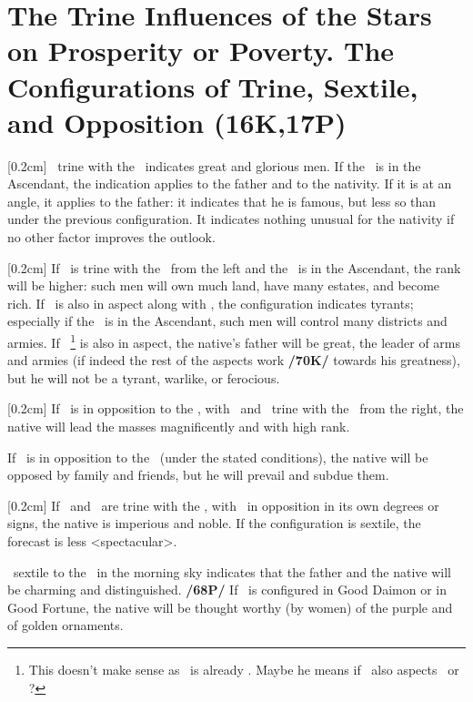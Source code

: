 \section{The Trine Influences of the Stars on Prosperity or Poverty. The Configurations of Trine, Sextile, and Opposition (16K,17P)}
\marginnote{\Jupiter \Trine \Sun}[0.2cm]
\Jupiter\, trine with the \Sun\, indicates great and glorious men. If the \Sun\, is in the Ascendant, the indication applies to the father and to the nativity. If it is at an angle, it applies to the father: it indicates that he is famous, but less so than under the previous configuration. It indicates nothing unusual for the nativity if no other factor improves the outlook. 

\marginnote{\Saturn \Trine \Sun}[0.2cm]
If \Saturn\, is trine with the \Sun\, from the left and the \Sun\, is in the Ascendant, the rank will be higher: such men will own much land, have many estates, and become rich. If \Mars\, is also in aspect along with \Jupiter, the configuration indicates tyrants; especially if the \Sun\, is in the Ascendant, such men will control many districts and armies. If \Saturn\, \footnote{This doesn't make sense as \Saturn\, is already \Trine\Sun. Maybe he means if \Saturn\, also aspects \Mars\, or \Jupiter?} is also in aspect, the native’s father will be great, the leader of arms and armies (if indeed the rest of the aspects work \textbf{/70K/} towards his greatness), but he will not be a tyrant, warlike, or ferocious. 

\marginnote{\Mars \Opposition \Sun}[0.2cm]
If \Mars\, is in opposition to the \Sun, with \Jupiter\, and \Saturn\, trine with the \Sun\, from the right, the native will lead the masses magnificently and with high rank. 

If \Saturn\, is in opposition to the \Sun\, (under the stated conditions), the native will be opposed by family and friends, but he will prevail and subdue
them. 

\marginnote{\Saturn\, \Mars \Trine \Sun}[0.2cm]
If \Saturn\, and \Mars\, are trine with the \Sun, with \Jupiter\, in opposition in its own degrees or signs, the native is imperious and noble. If the configuration is sextile, the forecast is less <spectacular>.

\Venus\, \marginnote{\Venus \Sextile \Sun} sextile to the \Sun\, in the morning sky indicates that the father and the native will be charming and distinguished. \textbf{/68P/} If \Venus\, is configured in Good Daimon or in Good Fortune, the native will be thought worthy (by women) of the purple and of golden ornaments.

